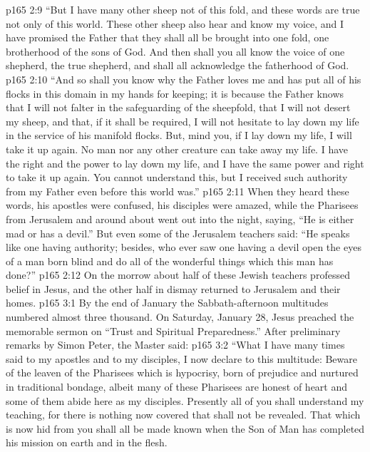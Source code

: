 \vs p165 2:9 \textcolor{ubdarkred}{“But I have many other sheep not of this fold, and these words are true not only of this world. These other sheep also hear and know my voice, and I have promised the Father that they shall all be brought into one fold, one brotherhood of the sons of God. And then shall you all know the voice of one shepherd, the true shepherd, and shall all acknowledge the fatherhood of God.}
\vs p165 2:10 \textcolor{ubdarkred}{“And so shall you know why the Father loves me and has put all of his flocks in this domain in my hands for keeping; it is because the Father knows that I will not falter in the safeguarding of the sheepfold, that I will not desert my sheep, and that, if it shall be required, I will not hesitate to lay down my life in the service of his manifold flocks. But, mind you, if I lay down my life, I will take it up again. No man nor any other creature can take away my life. I have the right and the power to lay down my life, and I have the same power and right to take it up again. You cannot understand this, but I received such authority from my Father even before this world was.”}
\vs p165 2:11 \pc When they heard these words, his apostles were confused, his disciples were amazed, while the Pharisees from Jerusalem and around about went out into the night, saying, “He is either mad or has a devil.” But even some of the Jerusalem teachers said: “He speaks like one having authority; besides, who ever saw one having a devil open the eyes of a man born blind and do all of the wonderful things which this man has done?”
\vs p165 2:12 On the morrow about half of these Jewish teachers professed belief in Jesus, and the other half in dismay returned to Jerusalem and their homes.
\vs p165 3:1 By the end of January the Sabbath\hyp{}afternoon multitudes numbered almost three thousand. On Saturday, January 28, Jesus preached the memorable sermon on “Trust and Spiritual Preparedness.” After preliminary remarks by Simon Peter, the Master said:
\vs p165 3:2 \pc \textcolor{ubdarkred}{“What I have many times said to my apostles and to my disciples, I now declare to this multitude: Beware of the leaven of the Pharisees which is hypocrisy, born of prejudice and nurtured in traditional bondage, albeit many of these Pharisees are honest of heart and some of them abide here as my disciples. Presently all of you shall understand my teaching, for there is nothing now covered that shall not be revealed. That which is now hid from you shall all be made known when the Son of Man has completed his mission on earth and in the flesh.}
